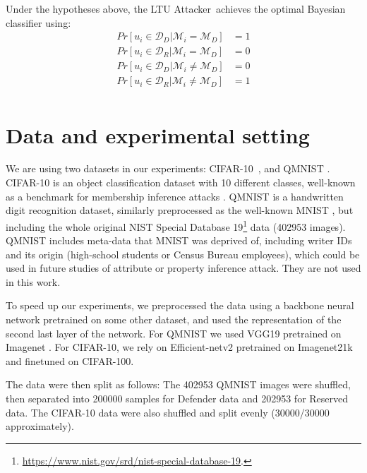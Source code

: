 \documentclass[letterpaper]{article}
\newcommand{\oracle}{LTU Attacker~}
\begin{document}
Under the hypotheses above, the \oracle achieves the optimal Bayesian classifier using:
\begin{align*}
Pr[u_i \in \mathcal{D}_{D} | \mathcal{M}_{i} = \mathcal{M}_{D}] &= 1 \\
Pr[u_i \in \mathcal{D}_{R} | \mathcal{M}_{i} = \mathcal{M}_{D}] &= 0 \\
Pr[u_i \in \mathcal{D}_{D} | \mathcal{M}_{i} \ne \mathcal{M}_{D}] &= 0 \\
Pr[u_i \in \mathcal{D}_{R} | \mathcal{M}_{i} \ne \mathcal{M}_{D}] &= 1 \\
\end{align*}



\section{Data and experimental setting}

We are using two datasets in our experiments: CIFAR-10~\cite{krizhevsky2009learning}, and QMNIST \cite{qmnist-2019}. CIFAR-10 is an object classification dataset with 10 different classes, well-known as a benchmark for membership inference attacks \cite{rahman2018membership,hilprecht2019reconstruction,shokri2017membership}.
QMNIST \cite{qmnist-2019} is a handwritten digit recognition dataset, similarly preprocessed as the well-known MNIST \cite{lecun1998gradient}, but including the whole original NIST Special Database 19\footnote{\url{https://www.nist.gov/srd/nist-special-database-19}.} data (402953 images). 
QMNIST includes meta-data that MNIST was deprived of, including writer IDs and its origin (high-school students or Census Bureau employees), which could be used in future studies of attribute or property inference attack. They are not used in this work. 

To speed up our experiments, we preprocessed the data using a backbone neural network pretrained on some other dataset, and used the representation of the second last layer of the network. For QMNIST we used VGG19 \cite{simonyan2014very} pretrained on Imagenet \cite{deng2009imagenet}.
For CIFAR-10, we rely on Efficient-netv2 \cite{tan2021efficientnetv2} pretrained on Imagenet21k and finetuned on CIFAR-100.

The data were then split as follows:
The 402953 QMNIST images were shuffled, then separated into 200000 samples for Defender data and 202953 for Reserved data.  
The CIFAR-10 data were also shuffled and split evenly (30000/30000 approximately).
\end{document}
